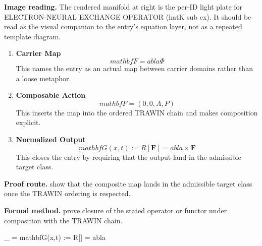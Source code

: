 \begin{samepage}
\noindent\begin{minipage}[t]{0.45\linewidth}
\vspace{0pt}
\raggedright
\scriptsize\textbf{Image reading.} The rendered manifold at right is the per-ID light plate for ELECTRON-NEURAL EXCHANGE OPERATOR (hatK sub ex). It should be read as the visual companion to the entry's equation layer, not as a repeated template diagram.\par
\end{minipage}\hfill
\begin{minipage}[t]{0.53\linewidth}
\vspace*{-0.10in}
\raggedright
{}
\end{minipage}
\end{samepage}

\clearpage


\begin{enumerate}[leftmargin=1.6em,itemsep=9pt,topsep=6pt]
\item \textbf{Carrier Map}
\[
mathbf{F} =  abla\Phi
\]
This names the entry as an actual map between carrier domains rather than a loose metaphor.

\item \textbf{Composable Action}
\[
mathbf{F} = (0,0,A,P)
\]
This inserts the map into the ordered TRAWIN chain and makes composition explicit.

\item \textbf{Normalized Output}
\[
mathbf{G}(x,t) := R[\mathbf{F}] =  abla\times \mathbf{F}
\]
This closes the entry by requiring that the output land in the admissible target class.
\end{enumerate}

\textbf{Proof route.} show that the composite map lands in the admissible target class once the TRAWIN ordering is respected.

\textbf{Formal method.} prove closure of the stated operator or functor under composition with the TRAWIN chain.

\medskip
{}

\begin{tzpsnapshot}
\end{tzpsnapshot}

\tzpequationlinks
  { \to {}}
  {_{} = \cdots}
  {mathbf{G}(x,t) := R[] =  abla\times {}}
